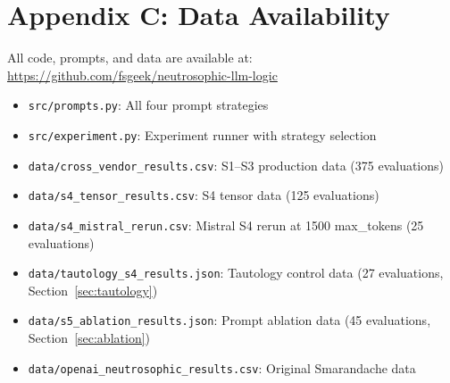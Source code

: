 \section{Appendix C: Data Availability}

All code, prompts, and data are available at:
\url{https://github.com/fsgeek/neutrosophic-llm-logic}

\begin{itemize}
\tightlist
\item
  \texttt{src/prompts.py}: All four prompt strategies
\item
  \texttt{src/experiment.py}: Experiment runner with strategy selection
\item
  \texttt{data/cross\_vendor\_results.csv}: S1--S3 production data (375
  evaluations)
\item
  \texttt{data/s4\_tensor\_results.csv}: S4 tensor data (125
  evaluations)
\item
  \texttt{data/s4\_mistral\_rerun.csv}: Mistral S4 rerun at 1500
  max\_tokens (25 evaluations)
\item
  \texttt{data/tautology\_s4\_results.json}: Tautology control data (27
  evaluations, Section~\ref{sec:tautology})
\item
  \texttt{data/s5\_ablation\_results.json}: Prompt ablation data (45
  evaluations, Section~\ref{sec:ablation})
\item
  \texttt{data/openai\_neutrosophic\_results.csv}: Original Smarandache
  data
\end{itemize}
